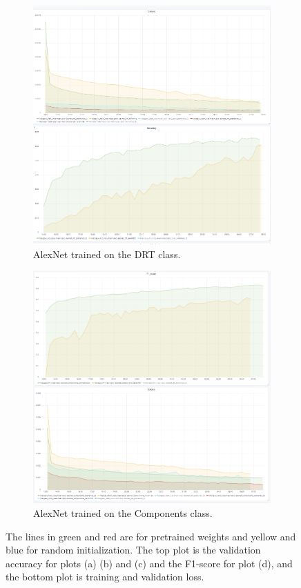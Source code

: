 \begin{figure}
\begin{subfigure}{.5\textwidth}
  \centering
  \includegraphics[width=.8\linewidth]{figures/04-Init_al_drt_acc.PNG}
  \caption{AlexNet trained on the DRT class.}
  \label{fig:alexinit_drt}
\end{subfigure}%
\begin{subfigure}{.5\textwidth}
  \centering
  \includegraphics[width=.8\linewidth]{figures/04-al_components_acc.PNG}
  \caption{AlexNet trained on the Components class.}
  \label{fig:alexinit_compo}
\end{subfigure}
\caption[Training and validation plots for AlexNet]{The lines in green and red are for pretrained weights and yellow and blue for random initialization. The top plot is the validation accuracy for plots (a) (b) and (c) and the F1-score for plot (d), and the bottom plot is training  and validation loss.}
\label{fig:plotsalex}
\end{figure}

